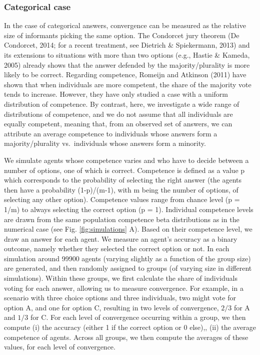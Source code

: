 \documentclass[
  doc,floatsintext]{apa6}
\begin{document}
\subsubsection{Categorical case}\label{categorical-case}

In the case of categorical answers, convergence can be measured as the relative size of informants picking the same option. The Condorcet jury theorem (De Condorcet, 2014; for a recent treatment, see Dietrich \& Spiekermann, 2013) and its extensions to situations with more than two options (e.g., Hastie \& Kameda, 2005) already shows that the answer defended by the majority/plurality is more likely to be correct. Regarding competence, Romeijn and Atkinson (2011) have shown that when individuals are more competent, the share of the majority vote tends to increase. However, they have only studied a case with a uniform distribution of competence. By contrast, here, we investigate a wide range of distributions of competence, and we do not assume that all individuals are equally competent, meaning that, from an observed set of answers, we can attribute an average competence to individuals whose answers form a majority/plurality vs.~individuals whose answers form a minority.

We simulate agents whose competence varies and who have to decide between a number of options, one of which is correct. Competence is defined as a value p which corresponds to the probability of selecting the right answer (the agents then have a probability (1-p)/(m-1), with m being the number of options, of selecting any other option). Competence values range from chance level (p = 1/m) to always selecting the correct option (p = 1). Individual competence levels are drawn from the same population competence beta distributions as in the numerical case (see Fig. \ref{fig:simulations} A). Based on their competence level, we draw an answer for each agent. We measure an agent's accuracy as a binary outcome, namely whether they selected the correct option or not. In each simulation around 99900 agents (varying slightly as a function of the group size) are generated, and then randomly assigned to groups (of varying size in different simulations). Within these groups, we first calculate the share of individuals voting for each answer, allowing us to measure convergence. For example, in a scenario with three choice options and three individuals, two might vote for option A, and one for option C, resulting in two levels of convergence, \(2/3\) for A and \(1/3\) for C. For each level of convergence occurring within a group, we then compute (i) the accuracy (either 1 if the correct option or 0 else),, (ii) the average competence of agents. Across all groups, we then compute the averages of these values, for each level of convergence.
\end{document}

